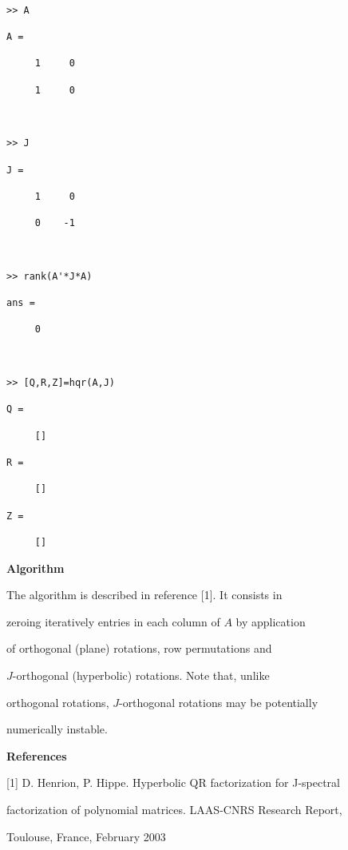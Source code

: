 \documentclass[12pt,a4paper]{article}
\begin{document}
\begin{verbatim}

>> A

A =

     1     0

     1     0



>> J

J =

     1     0

     0    -1



>> rank(A'*J*A)

ans =

     0



>> [Q,R,Z]=hqr(A,J)

Q =

     []

R =

     []

Z =

     []

\end{verbatim}



\bigskip



{\Large \textbf{Algorithm}}



The algorithm is described in reference [1]. It consists in

zeroing iteratively entries in each column of $A$ by application

of orthogonal (plane) rotations, row permutations and

$J$-orthogonal (hyperbolic) rotations. Note that, unlike

orthogonal rotations, $J$-orthogonal rotations may be potentially

numerically instable.



\bigskip



{\Large \textbf{References}}



[1] D. Henrion, P. Hippe. Hyperbolic QR factorization for J-spectral

factorization of polynomial matrices. LAAS-CNRS Research Report,

Toulouse, France, February 2003
\end{document}
